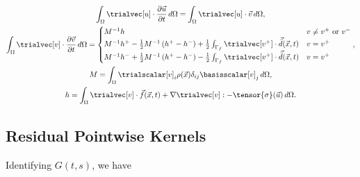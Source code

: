\begin{gather}
  \int_{\Omega} \trialvec[u] \cdot \frac{\partial \vec{u}}{\partial t} \, d\Omega = 
  \int_{\Omega} \trialvec[u] \cdot \vec{v} \, d\Omega, \\
 \int_{\Omega} \trialvec[v] \cdot \frac{\partial \vec{v}}{\partial t} \, d\Omega 
  = \begin{cases}
    M^{-1} h & v \neq v^+ \text{ or } v^- \\
    M^{-1} h^+ - \frac{1}{2} M^{-1} \left( h^+-h^- \right) + \frac{1}{2} \int_{\Gamma_f} \trialvec[v^+] \cdot \vec{\ddot{d}}(\vec{x}, t) & v = v^+ \\
    M^{-1} h^- + \frac{1}{2} M^{-1} \left( h^+-h^- \right) - \frac{1}{2} \int_{\Gamma_f} \trialvec[v^+] \cdot \vec{\ddot{d}}(\vec{x}, t) & v = v^+
  \end{cases}, \\
  M = \int_{\Omega} \trialscalar[v]_i \rho(\vec{x}) \delta_{ij} \basisscalar[v]_j \, d\Omega, \\
  h = \int_{\Omega} \trialvec[v] \cdot \vec{f}(\vec{x},t) + \nabla \trialvec[v] : -\tensor{\sigma}(\vec{u}) \, d\Omega.
\end{gather}

\subsection{Residual Pointwise Kernels}

Identifying $G(t,s)$, we have



